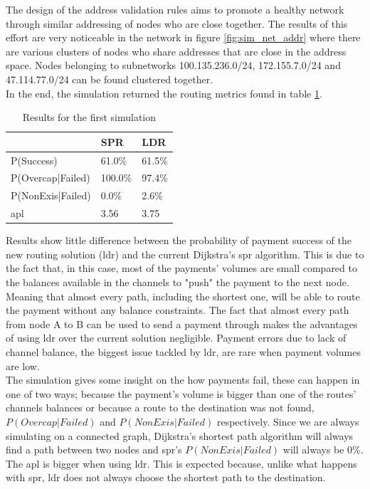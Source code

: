 The design of the address validation rules aims to promote a healthy network through similar addressing of nodes who are close together. The results of this effort are very noticeable in the network in figure \ref{fig:sim_net_addr} where there are various clusters of nodes who share addresses that are close in the address space. Nodes belonging to subnetworks 100.135.236.0/24, 172.155.7.0/24 and 47.114.77.0/24 can be found clustered together.\\
In the end, the simulation returned the routing metrics found in table \ref{table:simulation_results1}.

\begin{table}[H]
\begin{tabular}{l|l|l|}
\cline{2-3}
\rowcolor[HTML]{C0C0C0} 
\cellcolor[HTML]{FFFFFF}                  & SPR     & LDR    \\ \hline
\multicolumn{1}{|l|}{P(Success)}          & 61.0\%  & 61.5\% \\ \hline
\multicolumn{1}{|l|}{P(Overcap|Failed)}   & 100.0\% & 97.4\% \\ \hline
\multicolumn{1}{|l|}{P(NonExis|Failed)}   & 0.0\%   & 2.6\%  \\ \hline
\multicolumn{1}{|l|}{\acrshort{apl}} & 3.56    & 3.75   \\ \hline
\end{tabular}
\caption{Results for the first simulation}
\label{table:simulation_results1}
\end{table}

Results show little difference between the probability of payment success of the new routing solution (\acrshort{ldr}) and the current Dijkstra's \acrfull{spr} algorithm. This is due to the fact that, in this case, most of the payments' volumes are small compared to the balances available in the channels to "push" the payment to the next node. Meaning that almost every path, including the shortest one, will be able to route the payment without any balance constraints. The fact that almost every path from node A to B can be used to send a payment through makes the advantages of using \acrshort{ldr} over the current solution negligible. Payment errors due to lack of channel balance, the biggest issue tackled by \acrshort{ldr}, are rare when payment volumes are low.\\
The simulation gives some insight on the how payments fail, these can happen in one of two ways; because the payment's volume is bigger than one of the routes' channels balances or because a route to the destination was not found, $P(Overcap|Failed)$ and $P(NonExis|Failed)$ respectively. Since we are always simulating on a connected graph, Dijkstra's shortest path algorithm will always find a path between two nodes and \acrshort{spr}'s $P(NonExis|Failed)$ will always be 0\%.\\
The \acrfull{apl} is bigger when using \acrshort{ldr}. This is expected because, unlike what happens with \acrshort{spr}, \acrshort{ldr} does not always choose the shortest path to the destination.

